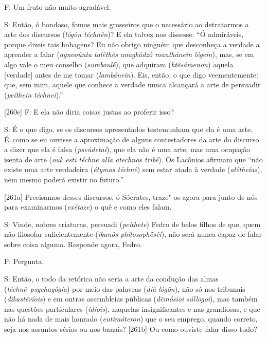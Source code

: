 F: Um fruto não muito agradável.

 

S: Então, ó bondoso, fomos mais grosseiros que o necessário ao
detratarmos a arte dos discursos (\emph{lógôn téchnên})? E ela talvez
nos dissesse: ``Ó admiráveis, porque dizeis tais bobagens? Eu não obrigo
ninguém que desconheça a verdade a aprender a falar (\emph{agnooûnta
talêthès anagkádzô manthánein légein}), mas, se em algo vale o meu
conselho (\emph{sumboulḗ}), que adquiram (\emph{ktêsámenon}) aquela
[verdade] antes de me tomar (\emph{lambánein}). Eis, então, o que digo
veementemente: que, sem mim, aquele que conhece a verdade nunca
alcançará a arte de persuadir (\emph{peíthein téchnei}).''

 

[260e] F: E ela não diria coisas justas ao proferir isso?

 

S: É o que digo, se os discursos apresentados testemunham que ela é uma
arte. É~como se eu ouvisse a aproximação de alguns contestadores da arte
do discurso a dizer que ela é falsa (\emph{pseúdetai}), que ela não é
uma arte, mas uma ocupação isenta de arte (\emph{ouk esti téchne alla
atechnos tribé}). Os Lacônios afirmam que ``não existe uma arte
verdadeira (\emph{étymos téchnê}) sem estar atada à verdade
(\emph{alêtheías}), nem mesmo poderá existir no futuro.''

 

 

[261a] Precisamos desses discursos, ó Sócrates, traze"-os agora para
junto de nós para examinarmos (\emph{exétaze}) o quê e como eles falam.

 

S: Vinde, nobres criaturas, persuadi (\emph{peíthete}) Fedro de belos
filhos de que, quem não filosofar suficientemente (\emph{ikanôs
philosophḗsêi}), não será nunca capaz de falar sobre coisa alguma.
Responde agora, Fedro.

 

F: Pergunta.

 

S: Então, o todo da retórica não seria a arte da condução das almas
(\emph{téchnê}~\emph{psychagôgía}) por meio das palavras (\emph{dià
lógôn}), não só nos tribunais (\emph{dikastêríois}) e em outras
assembleias públicas (\emph{dêmósioi súllogoi}), mas também nas questões
particulares (\emph{idíois}), naquelas insignificantes e nas grandiosas,
e que não há nada de mais honrado (\emph{entimóteron}) que o seu
emprego, quando correto, seja nos assuntos sérios ou nos banais?
[261b] Ou como ouviste falar disso tudo?

